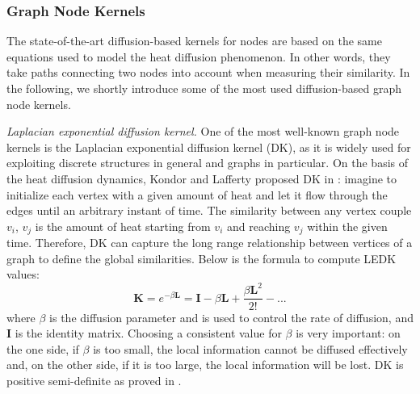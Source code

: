 \documentclass[review]{elsarticle}
\begin{document}
\subsubsection{Graph Node Kernels}
The state-of-the-art diffusion-based kernels for nodes are based on the same equations used to model the heat diffusion phenomenon. In other words, they take paths connecting two nodes into account when measuring their similarity. In the following, we shortly introduce some of the most used diffusion-based graph node kernels.

{\it Laplacian exponential diffusion kernel.} One of the most well-known graph node kernels is the Laplacian exponential diffusion kernel (DK), as it is widely used for exploiting discrete structures in general and graphs in particular. On the basis of the heat diffusion dynamics, Kondor and Lafferty proposed DK in \cite{kondor2002diffusion}: imagine to initialize each vertex with a given amount of heat and let it flow through the edges until an arbitrary instant of time. The similarity between any vertex couple $v_{i}$, $v_{j}$ is the amount of heat starting from $v_{i}$ and reaching $v_{j}$ within the given time. Therefore, DK can capture the long range relationship between vertices of a graph to define the global similarities. Below is the formula to compute LEDK values:
\begin{equation} 
\label{LEDK-formula}
\textbf{K} = e^{-\beta \textbf{L}} = \textbf{I} - \beta \textbf{L} + \frac{\beta \textbf{L}^{2}}{2!} - ...
\end{equation}
where $\beta$ is the diffusion parameter and is used to control the rate of diffusion, and $\textbf{I}$ is the identity matrix. Choosing a consistent value for $\beta$ is very important: on the one side, if $\beta$ is too small, the local information cannot be diffused effectively and, on the other side, if it is too large, the local information will be lost. DK is positive semi-definite as proved in \cite{kondor2002diffusion}.
\end{document}
